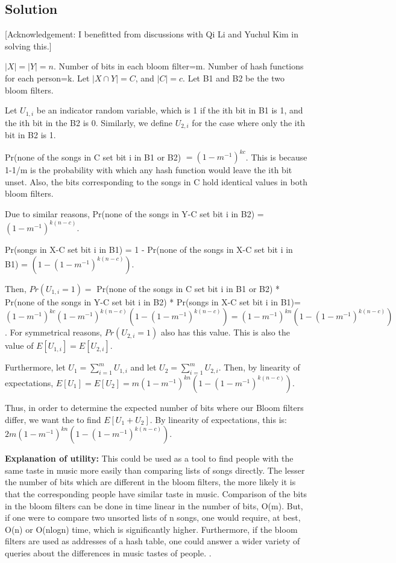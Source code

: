 \documentclass[10pt]{article}
\begin{document}
\subsection{Solution}
[Acknowledgement: I benefitted from discussions with Qi Li and Yuchul Kim in solving this.]

$|X|=|Y|=n$. Number of bits in each bloom filter=m. Number of hash functions for each person=k. Let $|X \cap Y|=C$, and $|C|=c$. Let B1 and B2 be the two bloom filters.

Let $U_{1,i}$ be an indicator random variable, which is 1 if the ith bit in B1 is 1, and the ith bit in the B2 is 0. Similarly, we define $U_{2,i}$ for the case where only the ith bit in B2 is 1.

Pr(none of the songs in C set bit i in B1 or B2) $=(1-m^{-1})^{kc}$. This is because 1-1/m is the probability with which any hash function would leave the ith bit unset. Also, the bits corresponding to the songs in C hold identical values in both bloom filters. 

Due to similar reasons, Pr(none of the songs in Y-C set bit i in B2) = $(1-m^{-1})^{k(n-c)}$.

Pr(songs in X-C set bit i in B1) = 1 - Pr(none of the songs in X-C set bit i in B1) = $(1-(1-m^{-1})^{k(n-c)})$.

Then, $Pr(U_{1,i}=1)=$ Pr(none of the songs in C set bit i in B1 or B2) * Pr(none of the songs in Y-C set bit i in B2) * Pr(songs in X-C set bit i in B1)= $(1-m^{-1})^{kc}  (1-m^{-1})^{k(n-c)} (1-(1-m^{-1})^{k(n-c)}) =(1-m^{-1})^{kn}(1-(1-m^{-1})^{k(n-c)})$. For symmetrical reasons, $Pr(U_{2,i}=1)$ also has this value. This is also the value of $E[U_{1,i}]=E[U_{2,i}]$.

Furthermore, let $U_{1} = \sum_{i=1}^{m} U_{1,i}$ and let $U_{2} = \sum_{i=1}^{m} U_{2,i}$. Then, by linearity of expectations, $E[U_{1}]=E[U_{2}]= m(1-m^{-1})^{kn}(1-(1-m^{-1})^{k(n-c)})$.

Thus, in order to determine the expected number of bits where our Bloom filters differ, we want the to find $E[U_{1}+U_{2}]$. By linearity of expectations, this is: $2m(1-m^{-1})^{kn}(1-(1-m^{-1})^{k(n-c)})$.

\textbf{Explanation of utility:} This could be used as a tool to find people with the same taste in music more easily than comparing lists of songs directly. The lesser the number of bits which are different in the bloom filters, the more likely it is that the corresponding people have similar taste in music. Comparison of the bits in the bloom filters can be done in time linear in the number of bits, O(m). But, if one were to compare two unsorted lists of n songs, one would require, at best, O(n) or O(nlogn) time, which is significantly higher. Furthermore, if the bloom filters are used as addresses of a hash table, one could answer a wider variety of queries about the differences in music tastes of people.
.
\end{document}
